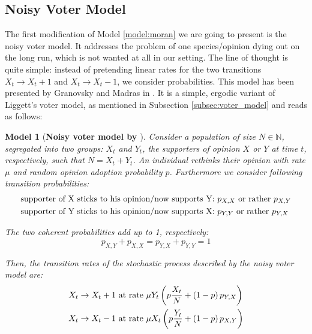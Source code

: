 \documentclass[12pt,a4paper,twoside]{article}
\newtheorem{model}{Model}[section]
\begin{document}
\subsection{Noisy Voter Model}\label{subsec:noisy_voter_model}
The first modification of Model \ref{model:moran} we are going to present is the noisy voter model. It addresses the problem of one species/opinion dying out on the long run, which is not wanted at all in our setting. The line of thought is quite simple: instead of pretending linear rates for the two transitions $X_t \rightarrow X_t + 1$ and $X_t \rightarrow X_t - 1$, we consider probabilities. This model has been presented by Granovsky and Madras in \cite{Granovsky1995}. It is a simple, ergodic variant of Liggett's voter model, as mentioned in Subsection \ref{subsec:voter_model} and reads as follows:
\begin{model}[\textbf{Noisy voter model by \cite{Granovsky1995}}]\label{model:noisy_voter_model}
	Consider a population of size $N \in \mathbb{N}$, segregated into two groups: $X_t$ and $Y_t$, the supporters of opinion $X$ or $Y$ at time $t$, respectively, such that $N = X_t + Y_t$. An individual rethinks their opinion with rate $\mu$ and random opinion adoption probability $p$. Furthermore we consider following transition probabilities:
	\begin{align}
	\begin{split}\label{def:noisy_probs}
		\textnormal{supporter of X sticks to his opinion/now supports Y:} &\textnormal{  } p_{X,X}\textnormal{ or rather }p_{X,Y}\\
		\textnormal{supporter of Y sticks to his opinion/now supports X:} &\textnormal{  } p_{Y,Y}\textnormal{ or rather }p_{Y,X}
	\end{split}
	\end{align}
	
	The two coherent probabilities add up to 1, respectively:
	\begin{equation}\label{eq:noisy_probs_add_to_1}
		p_{X,Y} + p_{X,X} = p_{Y,X} + p_{Y,Y} = 1
	\end{equation}
	
	 Then, the transition rates of the stochastic process described by the noisy voter model are:
	 \begin{align}\label{def:transition_rates_noisy_voter_model}
	 	\begin{split}
	 	X_t \rightarrow X_t + 1 & \textnormal{ at rate } \mu Y_t\left(p\frac{X_t}{N} + \left(1-p\right) p_{Y,X}\right)\\
	 	X_t \rightarrow X_t - 1 & \textnormal{ at rate } \mu X_t\left(p\frac{Y_t}{N} + \left(1-p\right)p_{X,Y}\right)
	 	\end{split}
	 \end{align}
\end{model}
\end{document}
